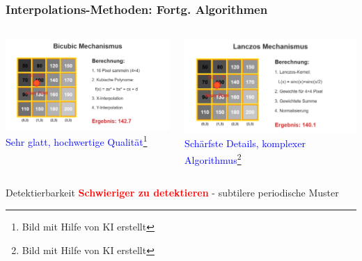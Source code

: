 \documentclass[11pt,t,usepdftitle=false,aspectratio=169]{beamer}
\begin{document}
\begin{frame}
	\frametitle{Interpolations-Methoden: Fortg. Algorithmen}
	
	\begin{columns}[T]
		\begin{column}{0.48\textwidth}
			\includegraphics[width=\textwidth]{images/bicubic_mechanism.png}
			\textcolor{blue}{\small Sehr glatt, hochwertige Qualität}\footnote{\tiny Bild mit Hilfe von KI erstellt}
		\end{column}
		\begin{column}{0.48\textwidth}
			\includegraphics[width=\textwidth]{images/lanczos_mechanism.png}
			\textcolor{blue}{\small Schärfste Details, komplexer Algorithmus}\footnote{\tiny Bild mit Hilfe von KI erstellt}
		\end{column}
	\end{columns}
	
	\begin{alertblock}{Detektierbarkeit}
		\textcolor{red}{\textbf{Schwieriger zu detektieren}} - subtilere periodische Muster
	\end{alertblock}
\end{frame}
\end{document}
